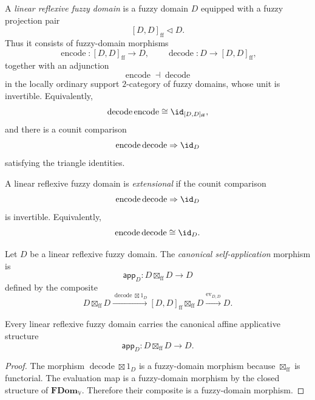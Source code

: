 \begin{definition}
\label{def:linear-reflexive-fuzzy-domain-type-theory}
A \emph{linear reflexive fuzzy domain} is a fuzzy domain \(D\) equipped with a
fuzzy projection pair
\[
    [D,D]_{\mathrm{ff}}\triangleleft D.
\]
Thus it consists of fuzzy-domain morphisms
\[
    \operatorname{encode}:[D,D]_{\mathrm{ff}}\to D,
    \qquad
    \operatorname{decode}:D\to [D,D]_{\mathrm{ff}},
\]
together with an adjunction
\[
    \operatorname{encode}\dashv \operatorname{decode}
\]
in the locally ordinary support \(2\)-category of fuzzy domains, whose unit is
invertible.  Equivalently,
\[
    \operatorname{decode}\operatorname{encode}
    \cong
    \id_{[D,D]_{\mathrm{ff}}},
\]
and there is a counit comparison
\[
    \operatorname{encode}\operatorname{decode}
    \Rightarrow
    \id_D
\]
satisfying the triangle identities.
\end{definition}

\begin{definition}
\label{def:extensional-linear-reflexive-fuzzy-domain-type-theory}
A linear reflexive fuzzy domain is \emph{extensional} if the counit comparison
\[
    \operatorname{encode}\operatorname{decode}
    \Rightarrow
    \id_D
\]
is invertible.  Equivalently,
\[
    \operatorname{encode}\operatorname{decode}
    \cong
    \id_D.
\]
\end{definition}

\begin{definition}
\label{def:canonical-self-application-fuzzy-domain}
Let \(D\) be a linear reflexive fuzzy domain.  The \emph{canonical
self-application} morphism is
\[
    \mathsf{app}_D:
    D\boxtimes_{\mathrm{ff}}D
    \longrightarrow
    D
\]
defined by the composite
\[
    D\boxtimes_{\mathrm{ff}}D
    \xrightarrow{\operatorname{decode}\boxtimes 1_D}
    [D,D]_{\mathrm{ff}}\boxtimes_{\mathrm{ff}}D
    \xrightarrow{\operatorname{ev}_{D,D}}
    D.
\]
\end{definition}

\begin{proposition}
\label{prop:canonical-affine-applicative-structure-fuzzy-domain}
Every linear reflexive fuzzy domain carries the canonical affine applicative
structure
\[
    \mathsf{app}_D:
    D\boxtimes_{\mathrm{ff}}D
    \longrightarrow
    D.
\]
\end{proposition}

\begin{proof}
The morphism \(\operatorname{decode}\boxtimes 1_D\) is a fuzzy-domain morphism
because \(\boxtimes_{\mathrm{ff}}\) is functorial.  The evaluation map is a
fuzzy-domain morphism by the closed structure of
\(\mathbf{FDom}_{\mathbb V}\).  Therefore their composite is a fuzzy-domain
morphism.
\end{proof}

